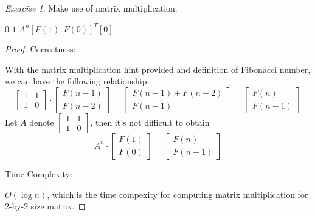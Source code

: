 \documentclass[a4paper,10pt,twoside]{article}
\theoremstyle{plain}
\theoremstyle{definition}
\theoremstyle{remark}
\newtheorem{exercise}{Exercise}
\begin{document}
\begin{exercise}
Make use of matrix multiplication.
\begin{algorithm}[h]
	\caption{$Fib(n)$}
		{\Return $0$}
		{\Return $1$}
		{\Return $A^n [F(1), F(0)]^T[0]$}
\end{algorithm}

\begin{proof}
Correctness: 

With the matrix multiplication hint provided and definition of Fibonacci number, we can have the following relationship
\begin{equation}
	\begin{bmatrix}1 & 1\\ 1 & 0\end{bmatrix}\cdot
	\begin{bmatrix}F(n-1)\\F(n-2)\end{bmatrix}
	= \begin{bmatrix}F(n-1) + F(n-2)\\F(n-1)\end{bmatrix}
	= \begin{bmatrix}F(n)\\F(n-1)\end{bmatrix}
\end{equation}
Let $A$  denote $\begin{bmatrix}1 & 1\\ 1 & 0\end{bmatrix}$, then it's not difficult to obtain 
 \begin{equation}
	A^n \cdot \begin{bmatrix}F(1)\\F(0)\end{bmatrix} = \begin{bmatrix}F(n)\\F(n-1)\end{bmatrix}
\end{equation}

Time Complexity:

$O(\log n)$, which is the time compexity for computing matrix multiplication for 2-by-2 size matrix.
\end{proof}
\end{exercise}
\end{document}
